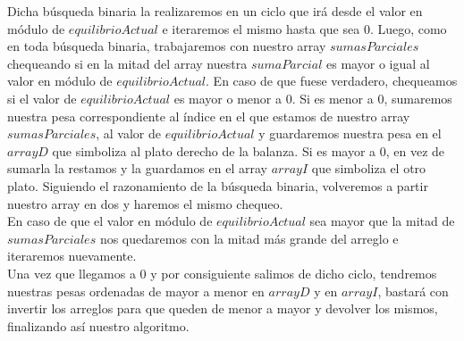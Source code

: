 Dicha b\'usqueda binaria la realizaremos en un ciclo que ir\'a desde el valor en m\'odulo de $equilibrioActual$ e iteraremos el mismo hasta que sea 0. Luego, como en toda b\'usqueda binaria, trabajaremos con nuestro array $sumasParciales$ chequeando si en la mitad del array nuestra $sumaParcial$ es mayor o igual al valor en m\'odulo de $equilibrioActual$. En caso de que fuese verdadero, chequeamos si el valor de $equilibrioActual$ es mayor o menor a 0. Si es menor a 0, sumaremos nuestra pesa correspondiente al \'indice en el que estamos de nuestro array $sumasParciales$, al valor de $equilibrioActual$ y guardaremos nuestra pesa en el $arrayD$ que simboliza al plato derecho de la balanza. Si es mayor a 0, en vez de sumarla la restamos y la guardamos en el array $arrayI$ que simboliza el otro plato. Siguiendo el razonamiento de la b\'usqueda binaria, volveremos a partir nuestro array en dos y haremos el mismo chequeo.\\

En caso de que el valor en m\'odulo de $equilibrioActual$ sea mayor que la mitad de $sumasParciales$ nos quedaremos con la mitad m\'as grande del arreglo e iteraremos nuevamente.\\

Una vez que llegamos a 0 y por consiguiente salimos de dicho ciclo, tendremos nuestras pesas ordenadas de mayor a menor en $arrayD$ y en $arrayI$, bastar\'a con invertir los arreglos para que queden de menor a mayor y devolver los mismos, finalizando as\'i nuestro algoritmo.\\
